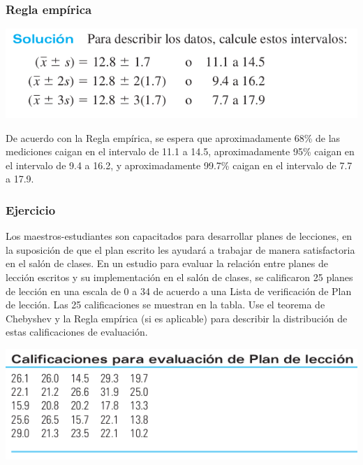 \documentclass[spanish]{beamer}
\begin{document}
\begin{frame}
\frametitle{Regla empírica}
\begin{center}
\includegraphics[scale=0.4]{im22}
\end{center}
De acuerdo con la Regla empírica, se espera que aproximadamente 68\% de las mediciones caigan en el intervalo de 11.1 a 14.5, aproximadamente 95\% caigan en el intervalo de 9.4 a 16.2, y aproximadamente 99.7\% caigan en el intervalo de 7.7 a 17.9.

\end{frame}
\begin{frame}
\frametitle{Ejercicio}
Los maestros-estudiantes son capacitados para desarrollar planes de lecciones, en la suposición de que el plan escrito les ayudará a trabajar de manera satisfactoria en el salón de clases. En un estudio para evaluar la relación entre planes de lección escritos y su implementación en el salón de clases, se calificaron 25 planes de lección en una escala de 0 a 34 de acuerdo a una Lista de verificación de Plan de lección. Las 25 calificaciones se
muestran en la tabla. Use el teorema de Chebyshev y la Regla empírica (si es aplicable) para describir la distribución de estas calificaciones de evaluación.
\begin{center}
\includegraphics[scale=0.4]{im23}
\end{center}


\end{frame}
\end{document}
